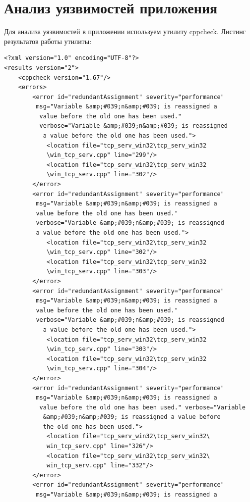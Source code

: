\documentclass[10pt,a4paper]{report}
\begin{document}
\section{Анализ уязвимостей приложения}
Для анализа уязвимостей в приложении используем утилиту cppcheck.
Листинг результатов работы утилиты:
\begin{lstlisting}
<?xml version="1.0" encoding="UTF-8"?>
<results version="2">
    <cppcheck version="1.67"/>
    <errors>
        <error id="redundantAssignment" severity="performance"
         msg="Variable &amp;#039;n&amp;#039; is reassigned a
          value before the old one has been used." 
          verbose="Variable &amp;#039;n&amp;#039; is reassigned
           a value before the old one has been used.">
            <location file="tcp_serv_win32\tcp_serv_win32
            \win_tcp_serv.cpp" line="299"/>
            <location file="tcp_serv_win32\tcp_serv_win32
            \win_tcp_serv.cpp" line="302"/>
        </error>
        <error id="redundantAssignment" severity="performance"
         msg="Variable &amp;#039;n&amp;#039; is reassigned a 
         value before the old one has been used." 
         verbose="Variable &amp;#039;n&amp;#039; is reassigned 
         a value before the old one has been used.">
            <location file="tcp_serv_win32\tcp_serv_win32
            \win_tcp_serv.cpp" line="302"/>
            <location file="tcp_serv_win32\tcp_serv_win32
            \win_tcp_serv.cpp" line="303"/>
        </error>
        <error id="redundantAssignment" severity="performance"
         msg="Variable &amp;#039;n&amp;#039; is reassigned a 
         value before the old one has been used." 
         verbose="Variable &amp;#039;n&amp;#039; is reassigned
           a value before the old one has been used.">
            <location file="tcp_serv_win32\tcp_serv_win32
            \win_tcp_serv.cpp" line="303"/>
            <location file="tcp_serv_win32\tcp_serv_win32
            \win_tcp_serv.cpp" line="304"/>
        </error>
        <error id="redundantAssignment" severity="performance"
         msg="Variable &amp;#039;n&amp;#039; is reassigned a
          value before the old one has been used." verbose="Variable
           &amp;#039;n&amp;#039; is reassigned a value before 
           the old one has been used.">
            <location file="tcp_serv_win32\tcp_serv_win32\
            win_tcp_serv.cpp" line="326"/>
            <location file="tcp_serv_win32\tcp_serv_win32\
            win_tcp_serv.cpp" line="332"/>
        </error>
        <error id="redundantAssignment" severity="performance"
         msg="Variable &amp;#039;n&amp;#039; is reassigned a

\end{lstlisting}
\end{document}
